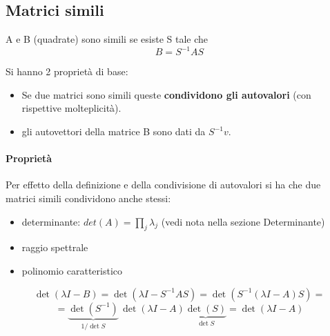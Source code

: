 \documentclass[12pt,a4paper,]{report}
\begin{document}
\subsection{Matrici simili}
\begin{definizione}
    \label{def: matrici simili}
    A e B (quadrate) sono simili se esiste S tale che
    \[
    B = S^{-1}AS
    \]
\end{definizione}
\begin{teorema}
    \label{th: prop base matr simili}
    Si hanno 2 proprietà di base:
    \begin{itemize}
        \item Se due matrici sono simili queste \textbf{condividono gli autovalori} (con rispettive molteplicità).
        \item gli autovettori della matrice B sono dati da $S^{-1}v$.
    \end{itemize}
\end{teorema}
\paragraph{Proprietà}
Per effetto della definizione e della condivisione di autovalori si ha che due matrici simili condividono anche stessi:
\begin{itemize}
    \item determinante: $det(A) = \prod_j \lambda_j$ (vedi nota nella sezione Determinante)
    \item raggio spettrale
    \item polinomio caratteristico
\end{itemize}
\begin{dimostrazionelibera}
    \[
    \det(\lambda I - B) = \det(\lambda I - S^{-1}AS) = \det\!\left(S^{-1}(\lambda I - A)S\right)=
    \]
    \[
    = \underbrace{\det(S^{-1})}_{1/\det S}\,\det(\lambda I - A)\underbrace{\det(S)}_{\det S}
    = \det(\lambda I - A)
    \]
\end{dimostrazionelibera}
\end{document}
